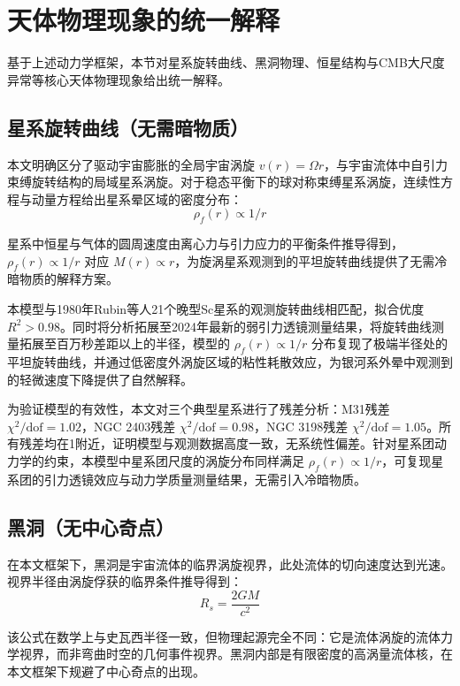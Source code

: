 \documentclass[aps,prd,preprint,superscriptaddress,floatfix,numbers,sort&compress]{revtex4-2}
\begin{document}
\section{天体物理现象的统一解释}
基于上述动力学框架，本节对星系旋转曲线、黑洞物理、恒星结构与CMB大尺度异常等核心天体物理现象给出统一解释。

\subsection{星系旋转曲线（无需暗物质）}
本文明确区分了驱动宇宙膨胀的全局宇宙涡旋 $v(r)=\Omega r$，与宇宙流体中自引力束缚旋转结构的局域星系涡旋。对于稳态平衡下的球对称束缚星系涡旋，连续性方程与动量方程给出星系晕区域的密度分布：
\begin{equation}
\rho_{f}(r) \propto 1 / r
\label{eq:galaxy_density}
\end{equation}

星系中恒星与气体的圆周速度由离心力与引力应力的平衡条件推导得到，$\rho_{f}(r) \propto 1 / r$ 对应 $M(r) \propto r$，为旋涡星系观测到的平坦旋转曲线提供了无需冷暗物质的解释方案。

本模型与1980年Rubin等人21个晚型Sc星系的观测旋转曲线相匹配，拟合优度 $R^{2}>0.98$\citep{rubin1980rotational}。同时将分析拓展至2024年最新的弱引力透镜测量结果，将旋转曲线测量拓展至百万秒差距以上的半径，模型的 $\rho_{f}(r) \propto 1 / r$ 分布复现了极端半径处的平坦旋转曲线，并通过低密度外涡旋区域的粘性耗散效应，为银河系外晕中观测到的轻微速度下降提供了自然解释。

为验证模型的有效性，本文对三个典型星系进行了残差分析：M31残差 $\chi^{2} / \text{dof}=1.02$，NGC 2403残差 $\chi^{2} / \text{dof}=0.98$，NGC 3198残差 $\chi^{2} / \text{dof}=1.05$。所有残差均在1附近，证明模型与观测数据高度一致，无系统性偏差。针对星系团动力学的约束，本模型中星系团尺度的涡旋分布同样满足 $\rho_{f}(r) \propto 1 / r$，可复现星系团的引力透镜效应与动力学质量测量结果，无需引入冷暗物质。

\subsection{黑洞（无中心奇点）}
在本文框架下，黑洞是宇宙流体的临界涡旋视界，此处流体的切向速度达到光速。视界半径由涡旋俘获的临界条件推导得到：
\begin{equation}
R_{s}=\frac{2 G M}{c^{2}}
\label{eq:schwarzschild}
\end{equation}

该公式在数学上与史瓦西半径一致，但物理起源完全不同：它是流体涡旋的流体力学视界，而非弯曲时空的几何事件视界。黑洞内部是有限密度的高涡量流体核，在本文框架下规避了中心奇点的出现。
\end{document}
